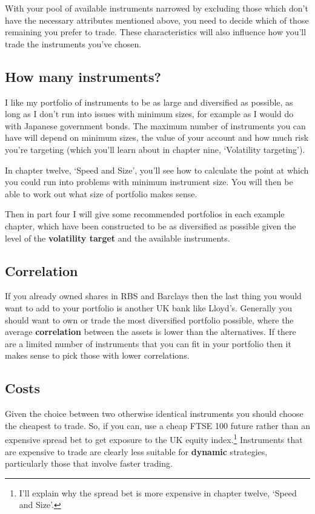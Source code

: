 With your pool of available instruments narrowed by excluding those which don't have the necessary attributes mentioned above, you need to decide which of those remaining you prefer to trade. These characteristics will also influence how you'll trade the instruments you've chosen.

\subsection*{How many instruments?}

I like my portfolio of instruments to be as large and diversified as possible, as long as I don't run into issues with minimum sizes, for example as I would do with Japanese government bonds. The maximum number of instruments you can have will depend on minimum sizes, the value of your account and how much risk you're targeting (which you'll learn about in chapter nine, ‘Volatility targeting').

In chapter twelve, ‘Speed and Size', you'll see how to calculate the point at which you could run into problems with minimum instrument size. You will then be able to work out what size of portfolio makes sense.

Then in part four I will give some recommended portfolios in each example chapter, which have been constructed to be as diversified as possible given the level of the \textbf{volatility target} and the available instruments.

\subsection*{Correlation}

If you already owned shares in RBS and Barclays then the last thing you would want to add to your portfolio is another UK bank like Lloyd's. Generally you should want to own or trade the most diversified portfolio possible, where the average \textbf{correlation} between the assets is lower than the alternatives. If there are a limited number of instruments that you can fit in your portfolio then it makes sense to pick those with lower correlations.

\subsection*{Costs}

Given the choice between two otherwise identical instruments you should choose the cheapest to trade. So, if you can, use a cheap FTSE 100 future rather than an expensive spread bet to get exposure to the UK equity index.\footnote{I'll explain why the spread bet is more expensive in chapter twelve, ‘Speed and Size'.} Instruments that are expensive to trade are clearly less suitable for \textbf{dynamic} strategies, particularly those that involve faster trading.

